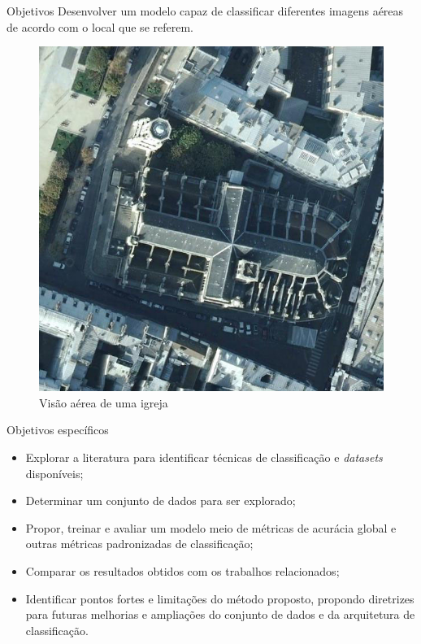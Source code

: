 \begin{frame}{Objetivos}
    Desenvolver um modelo capaz de classificar diferentes imagens aéreas de acordo com o local que se referem.

    \begin{figure}
        \centering
        \includegraphics[width=0.35\linewidth]{AID/church_56.jpg}
        \caption{Visão aérea de uma igreja}
    \end{figure}
    
\end{frame}

\begin{frame}{Objetivos específicos}
    \begin{itemize}
        \item Explorar a literatura para identificar técnicas de classificação e \textit{datasets} disponíveis;
        \item Determinar um conjunto de dados para ser explorado;
        \item Propor, treinar e avaliar um modelo meio de métricas de acurácia global e outras métricas padronizadas de classificação;
        \item Comparar os resultados obtidos com os trabalhos relacionados;
        \item Identificar pontos fortes e limitações do método proposto, propondo diretrizes para futuras melhorias e ampliações do conjunto de dados e da arquitetura de classificação.
    \end{itemize}
\end{frame}